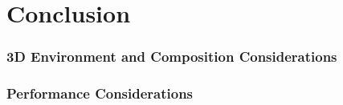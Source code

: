 %
\chapter{Conclusion}

\subsection{3D Environment and Composition Considerations}
\subsection{Performance Considerations}